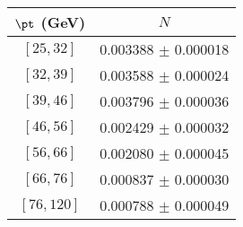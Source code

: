 \begin{tabular}{c||c}
$\pt$ (GeV) & $N$  \\
\hline
$[25, 32]$ & 0.003388 $\pm$ 0.000018\\
$[32, 39]$ & 0.003588 $\pm$ 0.000024\\
$[39, 46]$ & 0.003796 $\pm$ 0.000036\\
$[46, 56]$ & 0.002429 $\pm$ 0.000032\\
$[56, 66]$ & 0.002080 $\pm$ 0.000045\\
$[66, 76]$ & 0.000837 $\pm$ 0.000030\\
$[76, 120]$ & 0.000788 $\pm$ 0.000049\\
\end{tabular}
